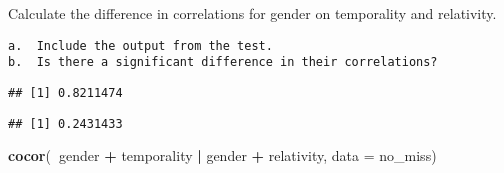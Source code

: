 \documentclass[
]{article}
\newenvironment{Shaded}{\begin{snugshade}}{\end{snugshade}}
\newcommand{\CommentTok}[1]{\textcolor[rgb]{0.56,0.35,0.01}{\textit{#1}}}
\newcommand{\DataTypeTok}[1]{\textcolor[rgb]{0.13,0.29,0.53}{#1}}
\newcommand{\KeywordTok}[1]{\textcolor[rgb]{0.13,0.29,0.53}{\textbf{#1}}}
\newcommand{\NormalTok}[1]{#1}
\newcommand{\OperatorTok}[1]{\textcolor[rgb]{0.81,0.36,0.00}{\textbf{#1}}}
\newcommand{\StringTok}[1]{\textcolor[rgb]{0.31,0.60,0.02}{#1}}
\begin{document}
Calculate the difference in correlations for gender on temporality and
relativity.

\begin{verbatim}
a.  Include the output from the test.
b.  Is there a significant difference in their correlations?
\end{verbatim}

\begin{Shaded}
\end{Shaded}

\begin{verbatim}
## [1] 0.8211474
\end{verbatim}

\begin{Shaded}
\end{Shaded}

\begin{verbatim}
## [1] 0.2431433
\end{verbatim}

\begin{Shaded}
\begin{Highlighting}[]
\KeywordTok{cocor}\NormalTok{(}\OperatorTok{~}\NormalTok{gender }\OperatorTok{+}\StringTok{ }\NormalTok{temporality }\OperatorTok{|}\StringTok{ }\NormalTok{gender }\OperatorTok{+}\StringTok{ }\NormalTok{relativity, }\DataTypeTok{data =}\NormalTok{ no_miss)}
\end{Highlighting}
\end{Shaded}
\end{document}
